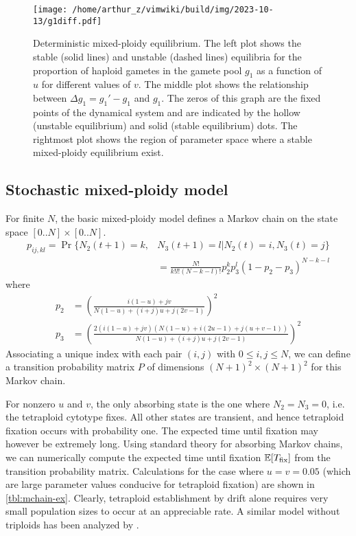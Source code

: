 \documentclass[11pt,a4paper]{article}
\begin{document}
\begin{figure}
\centering
\texttt{[image: /home/arthur\_z/vimwiki/build/img/2023-10-13/g1diff.pdf]}
\caption{
Deterministic mixed-ploidy equilibrium. The left plot shows the stable (solid
lines) and unstable (dashed lines) equilibria for the proportion of haploid
gametes in the gamete pool $g_1$ as a function of $u$ for different values of
$v$. The middle plot shows the relationship between $\Delta g_1 = g_1' - g_1$
and $g_1$. The zeros of this graph are the fixed points of the dynamical system
and are indicated by the hollow (unstable equilibrium) and solid (stable
equilibrium) dots. The rightmost plot shows the region of parameter space where
a stable mixed-ploidy equilibrium exist.
\label{fig:g1diff}}
\end{figure}

\subsection{Stochastic mixed-ploidy model \label{sec:mchain}}

For finite $N$, the basic mixed-ploidy model defines a Markov chain on the
state space $[0..N] \times [0..N]$.
\begin{align}
  p_{ij,kl} = \Pr\{N_2(t+1)=k,& N_3(t+1)=l | N_2(t)=i, N_3(t)=j\} \nonumber \\
    &= \frac{N!}{k!l!(N-k-l)!} p_2^k p_3^l (1-p_2-p_3)^{N-k-l}
\end{align}
where 
\begin{align}
  p_2 &= \left(\frac{i(1-u) + jv}{N(1-u) + (i+j)u + j(2v-1)}\right)^2 \\
  p_3 &= \left(\frac{2(i(1-u) + jv)(N(1-u) + i(2u - 1) + j(u + v - 1))}
    {N(1-u) + (i+j)u + j(2v-1)}\right)^2 
\end{align}
Associating a unique index with each pair $(i,j)$ with $0 \le i,j \le N$, we
can define a transition probability matrix $P$ of dimensions $(N+1)^2 \times
(N+1)^2$ for this Markov chain.

For nonzero $u$ and $v$, the only absorbing state is the one where $N_2 = N_3 =
0$, i.e. the tetraploid cytotype fixes.
All other states are transient, and hence tetraploid fixation occurs with
probability one.
The expected time until fixation may however be extremely long.
Using standard theory for absorbing Markov chains, we can numerically compute
the expected time until fixation $\mathbb{E}[T_{\text{fix}}]$ from the transition
probability matrix.
Calculations for the case where $u=v=0.05$ (which are large parameter values
conducive for tetraploid fixation) are shown in \cref{tbl:mchain-ex}.  Clearly,
tetraploid establishment by drift alone requires very small population sizes to
occur at an appreciable rate.
A similar model without triploids has been analyzed by \cite{rausch2005}.
\end{document}
